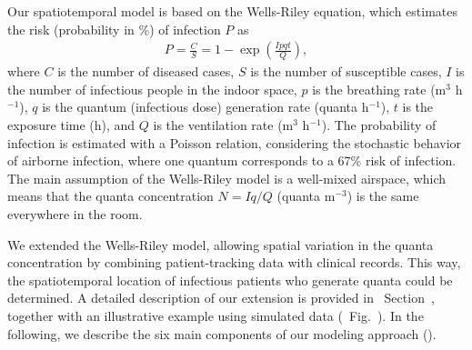 \documentclass[fleqn,11pt]{wlscirep}
\begin{document}
Our spatiotemporal model is based on the Wells-Riley equation\cite{Riley1961Book}, which estimates the risk (probability in \%) of infection $P$ as
\begin{align}
    P = \frac{C}{S} = 1 - \exp\left(\frac{Ipqt}{Q}\right),
\end{align}
where $C$ is the number of diseased cases, $S$ is the number of susceptible cases, $I$ is the number of infectious people in the indoor space, $p$ is the breathing rate (m$^3$ h$^{-1}$), $q$ is the quantum (infectious dose) generation rate (quanta h$^{-1}$), $t$ is the exposure time (h), and $Q$ is the ventilation rate (m$^3$ h$^{-1}$). The probability of infection is estimated with a Poisson relation, considering the stochastic behavior of airborne infection, where one quantum corresponds to a 67\% risk of infection. The main assumption of the Wells-Riley model is a well-mixed airspace, which means that the quanta concentration $N = Iq/Q$ (quanta m$^{-3}$) is the same everywhere in the room. 

We extended the Wells-Riley model, allowing spatial variation in the quanta concentration by combining patient-tracking data with clinical records. This way, the spatiotemporal location of infectious patients who generate quanta could be determined. A detailed description of our extension is provided in \supp~Section~, together with an illustrative example using simulated data (\supp~Fig.~). In the following, we describe the six main components of our modeling approach ().
\end{document}
